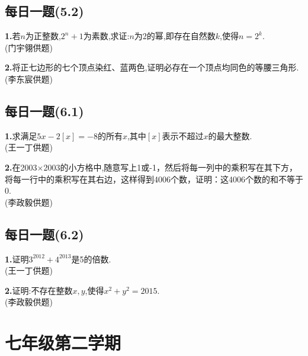 \documentclass{article}
\begin{document}
{\centering\subsection*{每日一题(5.2)}}
\par\textbf{1.}若$n$为正整数,$2^n+1$为素数,求证:$n$为2的幂,即存在自然数$k$,使得$n=2^k$.\\
{(门宇翎供题)}\\
\par\textbf{2.}将正七边形的七个顶点染红、蓝两色,证明必存在一个顶点均同色的等腰三角形.\\
{(李东宸供题)}\\

{\centering\subsection*{每日一题(6.1)}}
\par\textbf{1.}求满足$ 5x-2[x]=-8 $的所有$ x $,其中$ [x] $表示不超过$ x $的最大整数.\\
{(王一丁供题)}\\
\par\textbf{2.}在2003$ \times $2003的小方格中,随意写上1或-1，然后将每一列中的乘积写在其下方，将每一行中的乘积写在其右边，这样得到4006个数，证明：这4006个数的和不等于0.\\
{(李政毅供题)}\\

{\centering\subsection*{每日一题(6.2)}}
\par\textbf{1.}证明$ 3^{2012}+4^{2013} $是5的倍数.\\
{(王一丁供题)}\\
\par\textbf{2.}证明:不存在整数$ x,y $,使得$ x^2+y^2=2015 $.\\
{(李政毅供题)}
\newpage\section{七年级第二学期}
\end{document}
